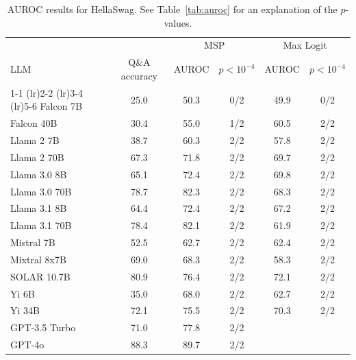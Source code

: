 \begin{table}[h]
\caption{AUROC results for HellaSwag. See Table~\ref{tab:auroc} for an explanation of the $p$-values.}
\label{tab:auroc_max}
\centering
\begin{tabular}{lccccc}
\toprule
& & \multicolumn{2}{c}{MSP} & \multicolumn{2}{c}{Max Logit} \\ 
LLM & Q\&A accuracy & AUROC & $p < 10^{-4}$ & AUROC & $p < 10^{-4}$ \\ 
\cmidrule(lr){1-1} \cmidrule(lr){2-2} \cmidrule(lr){3-4} \cmidrule(lr){5-6} 
Falcon 7B & 25.0 & 50.3 & 0/2 & 49.9 & 0/2\\
Falcon 40B & 30.4 & 55.0 & 1/2 & 60.5 & 2/2\\
Llama 2 7B & 38.7 & 60.3 & 2/2 & 57.8 & 2/2\\
Llama 2 70B & 67.3 & 71.8 & 2/2 & 69.7 & 2/2\\
Llama 3.0 8B & 65.1 & 72.4 & 2/2 & 69.8 & 2/2\\
Llama 3.0 70B & 78.7 & 82.3 & 2/2 & 68.3 & 2/2\\
Llama 3.1 8B & 64.4 & 72.4 & 2/2 & 67.2 & 2/2\\
Llama 3.1 70B & 78.4 & 82.1 & 2/2 & 61.9 & 2/2\\
Mistral 7B & 52.5 & 62.7 & 2/2 & 62.4 & 2/2\\
Mixtral 8x7B & 69.0 & 68.3 & 2/2 & 58.3 & 2/2\\
SOLAR 10.7B & 80.9 & 76.4 & 2/2 & 72.1 & 2/2\\
Yi 6B & 35.0 & 68.0 & 2/2 & 62.7 & 2/2\\
Yi 34B & 72.1 & 75.5 & 2/2 & 70.3 & 2/2\\
GPT-3.5 Turbo & 71.0 & 77.8 & 2/2 &  &\\
GPT-4o & 88.3 & 89.7 & 2/2 &  & \\
\bottomrule
\end{tabular}
\end{table}
